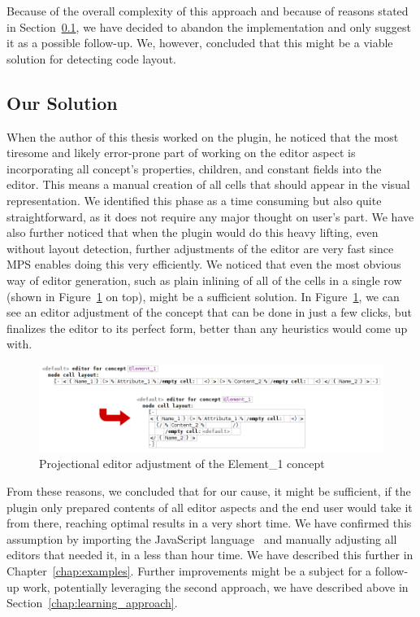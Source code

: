 Because of the overall complexity of this approach and because of reasons stated in Section~\ref{chap:editor_solution}, we have decided to abandon the implementation and only suggest it as a possible follow-up.
We, however, concluded that this might be a viable solution for detecting code layout.

\subsection{Our Solution}
\label{chap:editor_solution}

When the author of this thesis worked on the plugin, he noticed that the most tiresome and likely error-prone part of working on the editor aspect is incorporating all concept's properties, children, and constant fields into the editor.
This means a manual creation of all cells that should appear in the visual representation.
We identified this phase as a time consuming but also quite straightforward, as it does not require any major thought on user's part.
We have also further noticed that when the plugin would do this heavy lifting, even without layout detection, further adjustments of the editor are very fast since MPS enables doing this very efficiently.
We noticed that even the most obvious way of editor generation, such as plain inlining of all of the cells in a single row (shown in Figure~\ref{fig:editor_adjustment} on top), might be a sufficient solution.
In Figure~\ref{fig:editor_adjustment}, we can see an editor adjustment of the  concept that can be done in just a few clicks, but finalizes the editor to its perfect form, better than any heuristics would come up with.
\\

\begin{figure}[h]
	\centering
	\includegraphics[width=\textwidth]{./img/editor_adjustment.png}
	\caption{Projectional editor adjustment of the Element{\_}1 concept}
	\label{fig:editor_adjustment}
\end{figure}

From these reasons, we concluded that for our cause, it might be sufficient, if the plugin only prepared contents of all editor aspects and the end user would take it from there, reaching optimal results in a very short time.
We have confirmed this assumption by importing the JavaScript language~\cite{javascript} and manually adjusting all editors that needed it, in a less than hour time.
We have described this further in Chapter~\ref{chap:examples}.
Further improvements might be a subject for a follow-up work, potentially leveraging the second approach, we have described above in Section~\ref{chap:learning_approach}.


